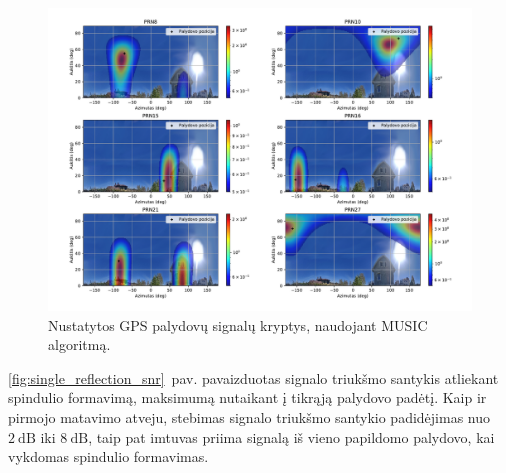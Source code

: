 \documentclass[main.tex]{subfiles}
\begin{document}
\begin{figure}[ht]
    \begin{centering}
    \includegraphics[scale=0.45]{drawings/one_reflection_2}
    \par\end{centering}
    \protect\caption{\label{fig:single_reflection}Nustatytos GPS palydovų signalų kryptys, naudojant MUSIC algoritmą.}
\end{figure}

\ref{fig:single_reflection_snr}~pav. pavaizduotas signalo triukšmo santykis atliekant spindulio formavimą,
maksimumą nutaikant į tikrąją palydovo padėtį. Kaip ir pirmojo matavimo atveju, stebimas signalo triukšmo
santykio padidėjimas
nuo $2\ \mathrm{dB}$ iki $8\ \mathrm{dB}$, taip pat
imtuvas priima signalą iš vieno papildomo palydovo, kai vykdomas spindulio formavimas.
\end{document}
